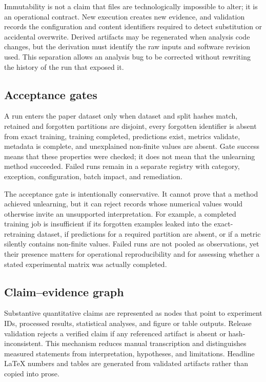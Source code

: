Immutability is not a claim that files are technologically impossible to alter; it is an
operational contract. New execution creates new evidence, and validation records the
configuration and content identifiers required to detect substitution or accidental
overwrite. Derived artifacts may be regenerated when analysis code changes, but the
derivation must identify the raw inputs and software revision used. This separation allows
an analysis bug to be corrected without rewriting the history of the run that exposed it.

\subsection{Acceptance gates}
A run enters the paper dataset only when dataset and split hashes match, retained and
forgotten partitions are disjoint, every forgotten identifier is absent from exact
training, training completed, predictions exist, metrics validate, metadata is complete,
and unexplained non-finite values are absent.  Gate success means that these properties
were checked; it does not mean that the unlearning method succeeded.  Failed runs remain in
a separate registry with category, exception, configuration, batch impact, and remediation.

The acceptance gate is intentionally conservative. It cannot prove that a method achieved
unlearning, but it can reject records whose numerical values would otherwise invite an
unsupported interpretation. For example, a completed training job is insufficient if its
forgotten examples leaked into the exact-retraining dataset, if predictions for a required
partition are absent, or if a metric silently contains non-finite values. Failed runs are
not pooled as observations, yet their presence matters for operational reproducibility and
for assessing whether a stated experimental matrix was actually completed.

\subsection{Claim--evidence graph}
Substantive quantitative claims are represented as nodes that point to experiment IDs,
processed results, statistical analyses, and figure or table outputs.  Release validation
rejects a verified claim if any referenced artifact is absent or hash-inconsistent.  This
mechanism reduces manual transcription and distinguishes measured statements from
interpretation, hypotheses, and limitations.  Headline LaTeX numbers and tables are
generated from validated artifacts rather than copied into prose.

